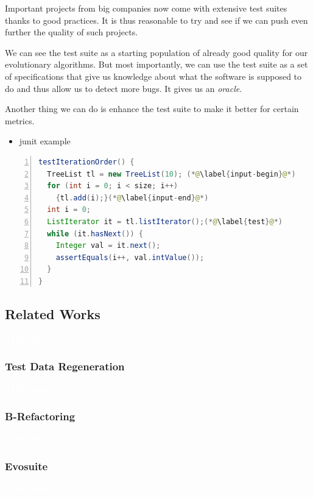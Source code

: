 \documentclass[11pt]{sdm}
\newcommand{\todo}[1]{\colorbox{Red!75}{\textcolor{white}{\textbf{TODO\ifx&#1&\else: #1\fi}}}}
\begin{document}
Important projects from big companies now come with extensive test suites thanks to good practices.
It is thus reasonable to try and see if we can push even further the quality of such projects.

We can see the test suite as a starting population of already good quality for our evolutionary algorithms.
But most importantly, we can use the test suite as a set of specifications that give us knowledge about what the software is supposed to do and thus allow us to detect more bugs.
It gives us an \textit{oracle}.

Another thing we can do is enhance the test suite to make it better for certain metrics.

\begin{itemize}
  \item junit example
\end{itemize}

\begin{lstlisting}[caption={An archetypal example of an object-oriented test case  (taken from the Apache Commons Collections, in the class TreeListTest, line 270)},label=lst:archetype,float,language=java,numbers=left]
testIterationOrder() {
  TreeList tl = new TreeList(10); (*@\label{input-begin}@*)
  for (int i = 0; i < size; i++)
    {tl.add(i);}(*@\label{input-end}@*)
  int i = 0;
  ListIterator it = tl.listIterator();(*@\label{test}@*)
  while (it.hasNext()) {
    Integer val = it.next();
    assertEquals(i++, val.intValue());
  }
}
\end{lstlisting}


\subsection{Related Works}
\label{related}
\todo{}

\subsubsection{Test Data Regeneration}
\cite{yoo2012test}
\todo{}

\subsubsection{B-Refactoring}
\cite{xuan2016b}
\todo{}

\subsubsection{Evosuite}
\cite{fraser2011evosuite}
\todo{}
\end{document}
